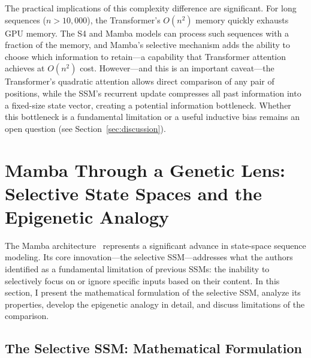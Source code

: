 \documentclass[12pt,a4paper]{article}
\begin{document}
The practical implications of this complexity difference are significant. For long sequences ($n > 10{,}000$), the Transformer's $O(n^2)$ memory quickly exhausts GPU memory. The S4 and Mamba models can process such sequences with a fraction of the memory, and Mamba's selective mechanism adds the ability to choose which information to retain---a capability that Transformer attention achieves at $O(n^2)$ cost. However---and this is an important caveat---the Transformer's quadratic attention allows direct comparison of any pair of positions, while the SSM's recurrent update compresses all past information into a fixed-size state vector, creating a potential information bottleneck. Whether this bottleneck is a fundamental limitation or a useful inductive bias remains an open question (see Section~\ref{sec:discussion}).

\section{Mamba Through a Genetic Lens: Selective State Spaces and the Epigenetic Analogy}
\label{sec:mamba}

The Mamba architecture~\cite{gu2023mamba} represents a significant advance in state-space sequence modeling. Its core innovation---the selective SSM---addresses what the authors identified as a fundamental limitation of previous SSMs: the inability to selectively focus on or ignore specific inputs based on their content. In this section, I present the mathematical formulation of the selective SSM, analyze its properties, develop the epigenetic analogy in detail, and discuss limitations of the comparison.

\subsection{The Selective SSM: Mathematical Formulation}
\label{sec:mamba-math}
\end{document}
